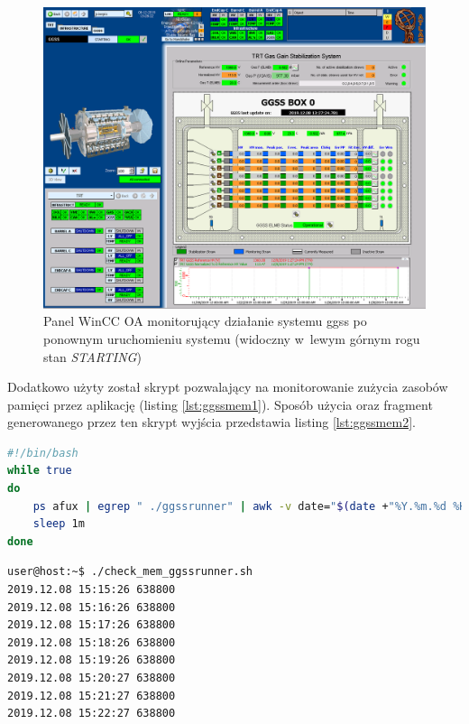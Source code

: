 \begin{figure}
\centering
\includegraphics[width=\textwidth]{res/png/ggssPoStarcie}
\caption{Panel WinCC OA monitorujący działanie systemu \gls*{ggss} po ponownym uruchomieniu systemu (widoczny w~lewym górnym rogu stan \textit{STARTING})}
\label{fig:ggssafterstart}
\end{figure}

\newpage
Dodatkowo użyty został skrypt pozwalający na monitorowanie zużycia zasobów pamięci przez aplikację (listing \ref{lst:ggssmem1}). Sposób użycia oraz fragment generowanego przez ten skrypt wyjścia przedstawia listing \ref{lst:ggssmem2}. 

\begin{lstlisting}[language=bash, caption={Skrypt \textit{check\_mem\_ggssrunner.sh} służacy do monitorowania pamięci używanej przez aplikację \textit{ggssrunner}}, label={lst:ggssmem1}]
#!/bin/bash
while true
do
    ps afux | egrep " ./ggssrunner" | awk -v date="$(date +"%Y.%m.%d %H:%M:%S")" '{print date, $5}'
    sleep 1m
done
\end{lstlisting}


\begin{lstlisting}[language=Cmd, caption={Wywołanie oraz fragment wyjścia skryptu \textit{check\_mem\_ggssrunner.sh} służacego do monitorowania pamięci używanej przez aplikację \textit{ggssrunner}}, label={lst:ggssmem2}]
user@host:~$ ./check_mem_ggssrunner.sh
2019.12.08 15:15:26 638800
2019.12.08 15:16:26 638800
2019.12.08 15:17:26 638800
2019.12.08 15:18:26 638800
2019.12.08 15:19:26 638800
2019.12.08 15:20:27 638800
2019.12.08 15:21:27 638800
2019.12.08 15:22:27 638800
\end{lstlisting}

